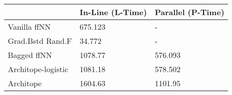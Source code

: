 \begin{tabular}{lll}
\toprule
{} & In-Line (L-Time) & Parallel (P-Time) \\
\midrule
Vanilla ffNN       &          675.123 &                 - \\
Grad.Bstd Rand.F   &           34.772 &                 - \\
Bagged ffNN        &          1078.77 &           576.093 \\
Architope-logistic &          1081.18 &           578.502 \\
Architope          &          1604.63 &           1101.95 \\
\bottomrule
\end{tabular}
